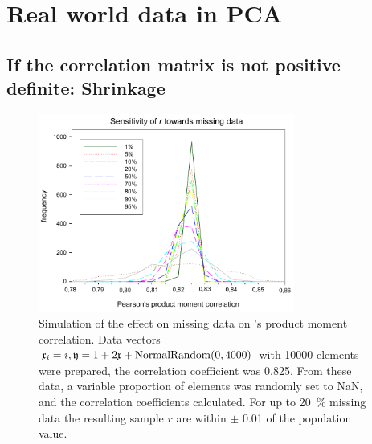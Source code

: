\section{Real world data in PCA}

\subsection{If the correlation matrix is not positive definite: Shrinkage}

\begin{figure}
   \caption{Simulation of the effect on missing data on 's product moment correlation. Data vectors \(\mathfrak{x}_i = i, \mathfrak{y} = 1 + 2\mathfrak{x} + \mathrm{NormalRandom}(0, 4000) \) with \num{10000} elements were prepared, the correlation coefficient was \num{0.825}. From these data, a variable proportion of elements was randomly set to NaN, and the correlation coefficients calculated. For up to \SI{20}{\%} missing data the resulting sample \(r \) are within \(\pm \) \num{0.01} of the population value.}
   \label{fig:Miss}
   \centering
      \includegraphics[width=0.75\textwidth]{Graphics/Simulation-MissingValues}
\end{figure}

